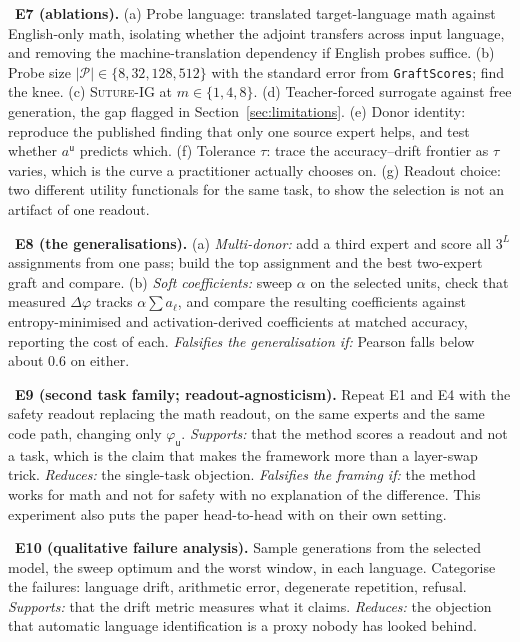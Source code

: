 \documentclass[10pt]{article}
\theoremstyle{plain}
\theoremstyle{definition}
\theoremstyle{remark}
\DeclareRobustCommand{\TORUN}[1]{\par\vspace{2pt}\noindent{\color{resred}\texttt{>>> TO RUN:}}\ #1\par\vspace{2pt}}
\newcommand{\util}{\mathsf{u}}
\begin{document}
\TORUN{\textbf{E7 (ablations).} (a) Probe language: translated target-language
math against English-only math, isolating whether the adjoint transfers across
input language, and removing the machine-translation dependency if English
probes suffice. (b) Probe size $|\mathcal{P}|\in\{8,32,128,512\}$ with the
standard error from \texttt{GraftScores}; find the knee. (c) \textsc{Suture}-IG
at $m\in\{1,4,8\}$. (d) Teacher-forced surrogate against free generation, the
gap flagged in Section~\ref{sec:limitations}. (e) Donor identity: reproduce the
published finding that only one source expert helps, and test whether
$a^{\util}$ predicts which. (f) Tolerance $\tau$: trace the accuracy--drift
frontier as $\tau$ varies, which is the curve a practitioner actually chooses on.
(g) Readout choice: two different utility functionals for the same task, to show
the selection is not an artifact of one readout.}

\TORUN{\textbf{E8 (the generalisations).} (a) \emph{Multi-donor:} add a third
expert and score all $3^{L}$ assignments from one pass; build the top assignment
and the best two-expert graft and compare. (b) \emph{Soft coefficients:} sweep
$\alpha$ on the selected units, check that measured $\Delta\varphi$ tracks
$\alpha\sum a_\ell$, and compare the resulting coefficients against
entropy-minimised \citep{yang2024adamerging} and activation-derived
\citep{acm2025} coefficients at matched accuracy, reporting the cost of each.
\emph{Falsifies the generalisation if:} Pearson falls below about $0.6$ on
either.}

\TORUN{\textbf{E9 (second task family; readout-agnosticism).} Repeat E1 and E4
with the safety readout replacing the math readout, on the same experts and the
same code path, changing only $\varphi_\util$. \emph{Supports:} that the method
scores a readout and not a task, which is the claim that makes the framework
more than a layer-swap trick. \emph{Reduces:} the single-task objection.
\emph{Falsifies the framing if:} the method works for math and not for safety
with no explanation of the difference. This experiment also puts the paper
head-to-head with \citet{shin2026safetyswap} on their own setting.}

\TORUN{\textbf{E10 (qualitative failure analysis).} Sample generations from the
selected model, the sweep optimum and the worst window, in each language.
Categorise the failures: language drift, arithmetic error, degenerate repetition,
refusal. \emph{Supports:} that the drift metric measures what it claims.
\emph{Reduces:} the objection that automatic language identification is a proxy
nobody has looked behind.}
\end{document}
